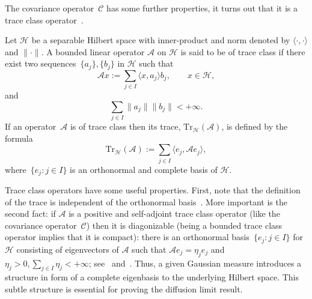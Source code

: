 The covariance operator~$\mathcal{C}$ has some further properties, it turns out that it is a trace class operator~\autocite[Proposition 2.15]{DaPrato1992}.

\begin{defin}\autocite[Section 1.1]{DaPrato2002}
\label{DLR-Setting: Definition trace class}
 Let $\mathcal{H}$ be a separable Hilbert space with inner-product and norm denoted by $\langle \cdot, \cdot \rangle$ and $\| \cdot \|$. A bounded linear operator $\mathcal{A}$ on $\mathcal{H}$ is said to be of trace class if there exist two sequences~$\{ a_j \}, \{ b_j \}$ in $\mathcal{H}$ such that
 \begin{equation*}
  \mathcal{A}x := \sum_{j \in I} \langle x, a_j \rangle b_j, \qquad x \in \mathcal{H},
 \end{equation*}
 and
 \begin{equation*}
  \sum_{j \in I} \| a_j \| \| b_j \| < + \infty.
 \end{equation*}
 If an operator~$\mathcal{A}$ is of trace class then its trace, $\text{Tr}_{\mathcal{H}}(\mathcal{A})$, is defined by the formula
 \begin{equation}
  \text{Tr}_{\mathcal{H}}(\mathcal{A}) := \sum_{j \in I} \langle e_j, \mathcal{A} e_j \rangle,
 \end{equation}
 where~$\{ e_j : j \in I \}$  is an orthonormal and complete basis of $\mathcal{H}$.

\end{defin}

Trace class operators have some useful properties. First, note that the definition of the trace is independent of the orthonormal basis~\autocite[Proposition C.1]{DaPrato1992}. More important is the second fact: if $\mathcal{A}$ is a positive and self-adjoint trace class operator (like the covariance operator~$\mathcal{C}$) then it is diagonizable (being a bounded trace class operator implies that it is compact): there is an orthonormal basis~$\{ e_j : j \in I \}$ for $\mathcal{H}$ consisting of eigenvectors of $\mathcal{A}$ such that $\mathcal{A} e_j = \eta_j e_j $ and $\eta_j > 0, \sum_{j \in I} \eta_j < + \infty$; see~\autocite[Lemma 6.32]{Dashti2014} and~\autocite[Proposition 3.15]{Hairer2009}. Thus, a given Gaussian measure introduces a structure in form of a complete eigenbasis to the underlying Hilbert space. This subtle structure is essential for proving the diffusion limit result.



